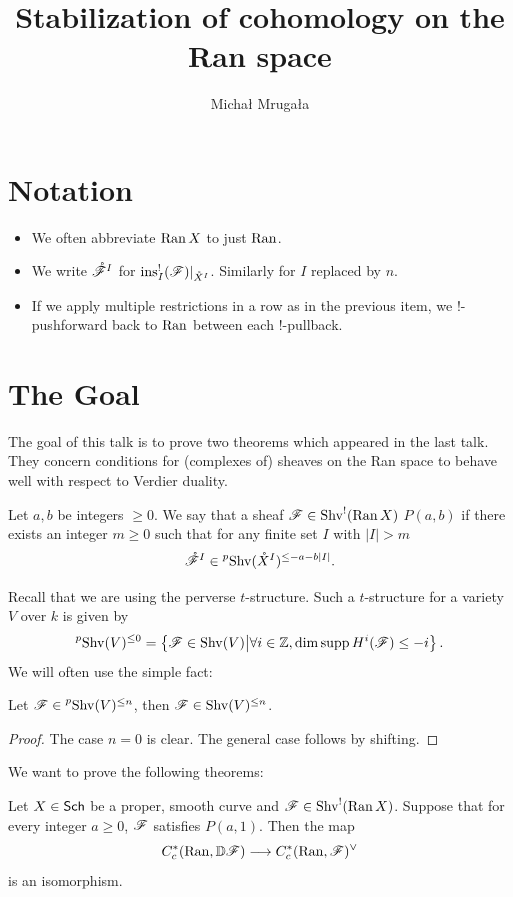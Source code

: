 \documentclass[oneside]{amsart}
\title{Stabilization of cohomology on the Ran space}
\author{Micha{\l} Mruga{\l}a}
\newcommand{\pShv}{\prescript{p}{}{\Shv}}
\DeclareMathOperator{\supp}{supp}
\begin{document}
\maketitle

\setcounter{section}{-1}
\section{Notation}
\begin{itemize}
	\item We often abbreviate $\operatorname{Ran} X$ to just $\operatorname{Ran}$.
	\item We write $\mathring{\mathscr{F}}^{I}$ for $\operatorname{ins}_I^{!}(\mathscr{F})|_{\mathring{X}^{I}}$. Similarly for $I$ replaced by $n$.
	\item If we apply multiple restrictions in a row as in the previous item, we !-pushforward back to $\operatorname{Ran}$ between each !-pullback.
\end{itemize}

\section{The Goal}
The goal of this talk is to prove two theorems which appeared in the last talk. They concern conditions for (complexes of) sheaves on the Ran space to behave well with respect to Verdier duality. 

\begin{definition}
	Let $a,b$ be integers $\ge 0$. We say that a sheaf $\mathscr{F}\in \operatorname{Shv}^{!}(\operatorname{Ran} X)$  $P(a,b)$ if there exists an integer $m\ge 0$ such that for any finite set $I$ with $|I|>m$
	\[
		\mathring{\CF}^{I}\in \pShv(\mathring{X}^{I})^{\le -a-b|I|}.
	\] 
\end{definition}

Recall that we are using the perverse $t$-structure. Such a $t$-structure for a variety $V$ over $k$ is given by
\[
\pShv(V)^{\le 0} = \left\{ \CF\in \Shv(V) \middle| \forall i\in \Z,\dim\supp H^{i}(\CF) \le -i \right\}. 
\] 
We will often use the simple fact:
\begin{proposition}\label{prop:ptoc}
	Let $\CF\in \pShv(V)^{\le n}$, then $\mathscr{F}\in \operatorname{Shv}(V)^{\le n}$.
\end{proposition}
\begin{proof}
	The case $n=0$ is clear. The general case follows by shifting.
\end{proof}

We want to prove the following theorems:
\begin{theorem}\label{thm:vd}
	Let $X\in \mathsf{Sch}$ be a proper, smooth curve and $\mathscr{F}\in \operatorname{Shv}^{!}(\operatorname{Ran} X)$. Suppose that for every integer $a\ge 0$, $\mathscr{F}$ satisfies $P(a,1)$. Then the map
	\[
	C^{*}_c(\Ran, \VD\CF) \to C^{*}_c(\Ran, \CF)^{\vee}
	\] 
	is an isomorphism.
\end{theorem}
\end{document}
